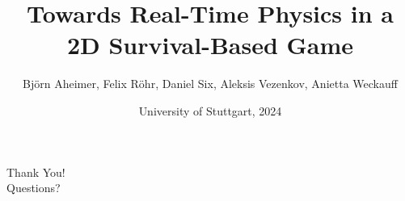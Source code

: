 \documentclass{beamer}
\title{Towards Real-Time Physics in a 2D Survival-Based Game}
\author{Björn Aheimer, Felix Röhr, Daniel Six, Aleksis Vezenkov, Anietta Weckauff}
\date{University of Stuttgart, 2024}
\begin{document}
\begin{frame}
    \titlepage
\end{frame}








\begin{frame}
    \centering
    \Huge Thank You! \\
    \vspace{1cm}
    \Large Questions?
\end{frame}
\end{document}
